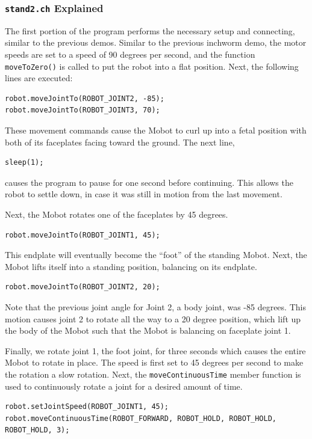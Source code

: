 \documentclass{article}
\begin{document}
\subsubsection{\texttt{stand2.ch} Explained}
The first portion of the program performs the necessary setup and connecting,
similar to the previous demos. Similar to the previous inchworm demo, the
motor speeds are set to a speed of 90 degrees per second, and the function \texttt{moveToZero()} is
called to put the robot into a flat position. Next, the following lines
are executed:
\begin{verbatim}
robot.moveJointTo(ROBOT_JOINT2, -85);
robot.moveJointTo(ROBOT_JOINT3, 70);
\end{verbatim}
These movement commands cause the Mobot to curl up into a fetal position with
both of its faceplates facing toward the ground. The next line, 

\begin{verbatim}
sleep(1);
\end{verbatim}
causes the program to pause for one second before continuing. This allows the
robot to settle down, in case it was still in motion from the last movement.

Next, the Mobot rotates one 
of the faceplates by 45 degrees. 
\begin{verbatim}
robot.moveJointTo(ROBOT_JOINT1, 45);
\end{verbatim}
This endplate will eventually become the ``foot'' of the standing Mobot. Next,
the Mobot lifts itself into a standing position, balancing on its endplate.
\begin{verbatim}
robot.moveJointTo(ROBOT_JOINT2, 20);
\end{verbatim}
Note that the previous joint angle for Joint 2, a body joint, was -85 degrees. 
This motion causes joint 2 to rotate all the way to a 20 degree position, which
lift up the body of the Mobot such that the Mobot is balancing on faceplate joint 1.

Finally, we rotate joint 1, the foot joint, for three seconds which causes the
entire Mobot to rotate in place. The speed is first set to 45 degrees per second to make the
rotation a slow rotation. Next, the \texttt{moveContinuousTime} member function
is used to continuously rotate a joint for a desired amount of time.
\begin{verbatim}
robot.setJointSpeed(ROBOT_JOINT1, 45);
robot.moveContinuousTime(ROBOT_FORWARD, ROBOT_HOLD, ROBOT_HOLD, ROBOT_HOLD, 3);
\end{verbatim}
\end{document}
